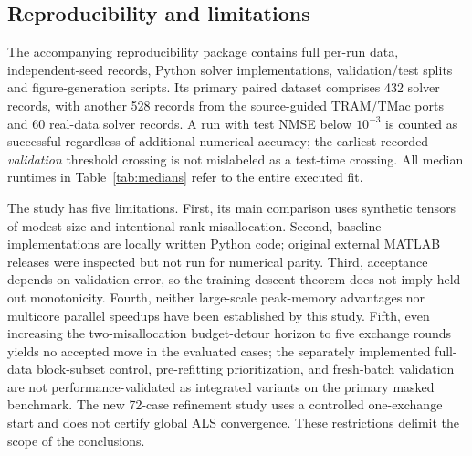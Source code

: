 \documentclass[review,10pt]{elsarticle}
\begin{document}
\subsection{Reproducibility and limitations}\label{subsec:limitations}
The accompanying reproducibility package contains full per-run data, independent-seed records, Python solver implementations, validation/test splits and figure-generation scripts. Its primary paired dataset comprises 432 solver records, with another 528 records from the source-guided TRAM/TMac ports and 60 real-data solver records. A run with test NMSE below $10^{-3}$ is counted as successful regardless of additional numerical accuracy; the earliest recorded \emph{validation} threshold crossing is not mislabeled as a test-time crossing. All median runtimes in Table~\ref{tab:medians} refer to the entire executed fit.

The study has five limitations. First, its main comparison uses synthetic tensors of modest size and intentional rank misallocation. Second, baseline implementations are locally written Python code; original external MATLAB releases were inspected but not run for numerical parity. Third, acceptance depends on validation error, so the training-descent theorem does not imply held-out monotonicity. Fourth, neither large-scale peak-memory advantages nor multicore parallel speedups have been established by this study. Fifth, even increasing the two-misallocation budget-detour horizon to five exchange rounds yields no accepted move in the evaluated cases; the separately implemented full-data block-subset control, pre-refitting prioritization, and fresh-batch validation are not performance-validated as integrated variants on the primary masked benchmark. The new 72-case refinement study uses a controlled one-exchange start and does not certify global ALS convergence. These restrictions delimit the scope of the conclusions.
\end{document}
